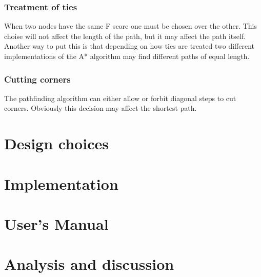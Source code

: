 \documentclass[12pt, a4paper]{article}
\begin{document}

\subsubsection{Treatment of ties}

When two nodes have the same F score one must be chosen over the other. This
choise will not affect the length of the path, but it may affect the path
itself. Another way to put this is that depending on how ties are treated two
different implementations of the A* algorithm may find different paths of equal
length. \cite{astar2}


\subsubsection{Cutting corners}

The pathfinding algorithm can either allow or forbit diagonal steps to cut
corners. Obviously this decision may affect the shortest path. \cite{astar2}


\section{Design choices}


\section{Implementation}


\section{User's Manual}



\section{Analysis and discussion}

\pagebreak


\end{document}
